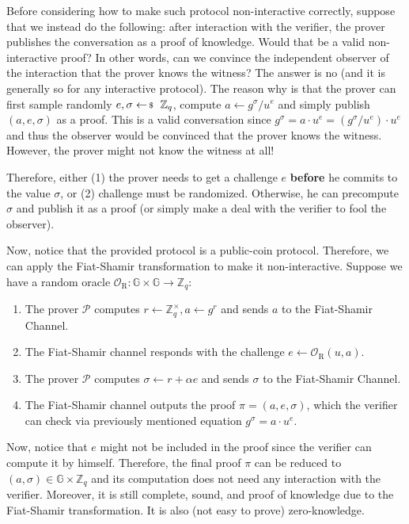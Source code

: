 \documentclass[../lecture-notes-148x210.tex]{subfiles}
\begin{document}
\vspace{10px}

\begin{remark}
    Before considering how to make such protocol non-interactive correctly, suppose that we instead do the following: after interaction with the verifier, the prover publishes the conversation as a proof of knowledge. Would that be a valid non-interactive proof? In other words, can we convince the independent observer of the interaction that the prover knows the witness? The answer is no (and it is generally so for any interactive protocol). The reason why is that the prover can first sample randomly $e,\sigma \leftarrowS \mathbb{Z}_q$, compute $a \gets g^{\sigma}/u^e$ and simply publish $(a,e,\sigma)$ as a proof. This is a valid conversation since $g^{\sigma} = a \cdot u^{e} = (g^{\sigma}/u^e) \cdot u^e$ and thus the observer would be convinced that the prover knows the witness. However, the prover might not know the witness at all!

    Therefore, either (1) the prover needs to get a challenge $e$ \textbf{before} he commits to the value $\sigma$, or (2) challenge must be randomized. Otherwise, he can precompute $\sigma$ and publish it as a proof (or simply make a deal with the verifier to fool the observer). 
\end{remark}

Now, notice that the provided protocol is a public-coin protocol. Therefore, we can apply the Fiat-Shamir transformation to make it non-interactive. Suppose we have a random oracle $\mathcal{O}_{\text{R}}: \mathbb{G} \times \mathbb{G} \to \mathbb{Z}_q$:
\begin{enumerate}
    \item The prover $\mathcal{P}$ computes $r \gets \mathbb{Z}_q^{\times}, a \gets g^{r}$ and sends $a$ to the Fiat-Shamir Channel.
    \item The Fiat-Shamir channel responds with the challenge $e \gets \mathcal{O}_{\text{R}}(u,a)$.
    \item The prover $\mathcal{P}$ computes $\sigma \gets r + \alpha e$ and sends $\sigma$ to the Fiat-Shamir Channel.
    \item The Fiat-Shamir channel outputs the proof $\pi = (a,e,\sigma)$, which the verifier can check via previously mentioned equation $g^{\sigma} = a \cdot u^e$.
\end{enumerate}

Now, notice that $e$ might not be included in the proof since the verifier can compute it by himself. Therefore, the final proof $\pi$ can be reduced to $(a,\sigma) \in \mathbb{G} \times \mathbb{Z}_q$ and its computation does not need any interaction with the verifier. Moreover, it is still complete, sound, and proof of knowledge due to the Fiat-Shamir transformation. It is also (not easy to prove) zero-knowledge.
\end{document}
